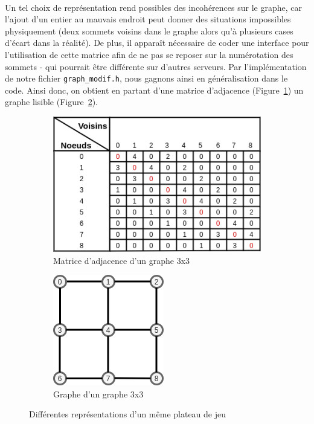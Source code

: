 \documentclass[a4paper]{article}
\begin{document}
\paragraph{}
Un tel choix de représentation rend possibles des incohérences sur le graphe, car l'ajout d'un entier au mauvais endroit peut donner des situations impossibles physiquement (deux sommets voisins dans le graphe alors qu'à plusieurs cases d'écart dans la réalité). De plus, il apparaît nécessaire de coder une interface pour l'utilisation de cette matrice afin de ne pas se reposer sur la numérotation des sommets - qui pourrait être différente sur d'autres serveurs. Par l'implémentation de notre fichier \texttt{graph\_modif.h}, nous gagnons ainsi en généralisation dans le code. Ainsi donc, on obtient en partant d'une matrice d'adjacence (Figure~\ref{fig:matrice}) un graphe lisible (Figure~\ref{fig:graphe}). \\

\begin{figure}[ht]
    \centering
    \begin{subfigure}{.5\textwidth}
        \centering
        \includegraphics[scale=0.65]{matrice_adjacence.png}
        \caption{Matrice d'adjacence d'un graphe 3x3}
        \label{fig:matrice}
    \end{subfigure}%
    \begin{subfigure}{.5\textwidth}
        \centering
        \includegraphics[scale=0.86]{graphe.png}
        \caption{Graphe d'un graphe 3x3}
        \label{fig:graphe}
    \end{subfigure}
    
    \caption{Différentes représentations d'un même plateau de jeu}
    \label{fig:representations}
\end{figure}
\end{document}
